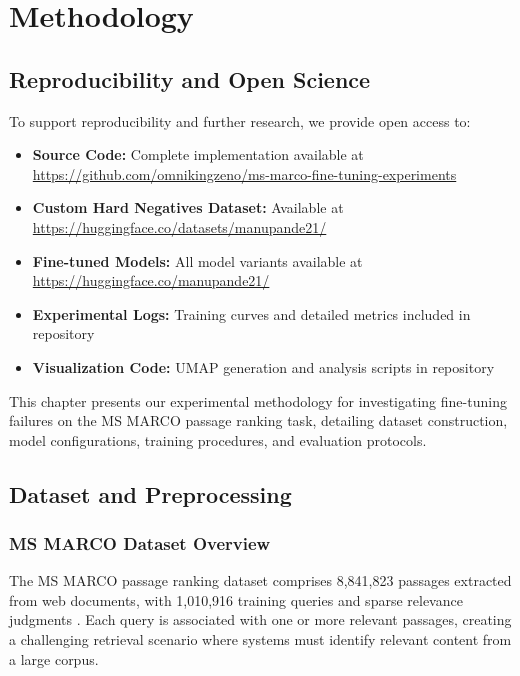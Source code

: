 
\chapter{Methodology} %

\label{Chapter4} %


\section{Reproducibility and Open Science}

To support reproducibility and further research, we provide open access to:

\begin{itemize}
\item \textbf{Source Code:} Complete implementation available at \url{https://github.com/omnikingzeno/ms-marco-fine-tuning-experiments}
\item \textbf{Custom Hard Negatives Dataset:} Available at \url{https://huggingface.co/datasets/manupande21/}
\item \textbf{Fine-tuned Models:} All model variants available at \url{https://huggingface.co/manupande21/}
\item \textbf{Experimental Logs:} Training curves and detailed metrics included in repository
\item \textbf{Visualization Code:} UMAP generation and analysis scripts in repository
\end{itemize}

This chapter presents our experimental methodology for investigating fine-tuning failures on the MS MARCO passage ranking task, detailing dataset construction, model configurations, training procedures, and evaluation protocols.

\section{Dataset and Preprocessing}

\subsection{MS MARCO Dataset Overview}

The MS MARCO passage ranking dataset comprises 8,841,823 passages extracted from web documents, with 1,010,916 training queries and sparse relevance judgments \cite{msmarco}. Each query is associated with one or more relevant passages, creating a challenging retrieval scenario where systems must identify relevant content from a large corpus.

